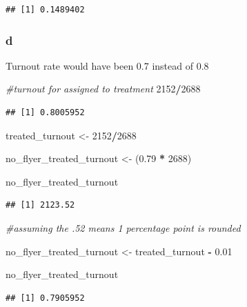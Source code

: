 \documentclass[
]{article}
\newenvironment{Shaded}{\begin{snugshade}}{\end{snugshade}}
\newcommand{\CommentTok}[1]{\textcolor[rgb]{0.56,0.35,0.01}{\textit{#1}}}
\newcommand{\DecValTok}[1]{\textcolor[rgb]{0.00,0.00,0.81}{#1}}
\newcommand{\FloatTok}[1]{\textcolor[rgb]{0.00,0.00,0.81}{#1}}
\newcommand{\NormalTok}[1]{#1}
\newcommand{\OtherTok}[1]{\textcolor[rgb]{0.56,0.35,0.01}{#1}}
\newcommand{\SpecialCharTok}[1]{\textcolor[rgb]{0.81,0.36,0.00}{\textbf{#1}}}
\begin{document}
\begin{verbatim}
## [1] 0.1489402
\end{verbatim}

\subsubsection{d}\label{d-2}

Turnout rate would have been 0.7 instead of 0.8

\begin{Shaded}
\begin{Highlighting}[]
\CommentTok{\#turnout for assigned to treatment}
\DecValTok{2152}\SpecialCharTok{/}\DecValTok{2688}
\end{Highlighting}
\end{Shaded}

\begin{verbatim}
## [1] 0.8005952
\end{verbatim}

\begin{Shaded}
\begin{Highlighting}[]
\NormalTok{treated\_turnout }\OtherTok{\textless{}{-}} \DecValTok{2152}\SpecialCharTok{/}\DecValTok{2688}

\NormalTok{no\_flyer\_treated\_turnout }\OtherTok{\textless{}{-}}\NormalTok{ (}\FloatTok{0.79} \SpecialCharTok{*} \DecValTok{2688}\NormalTok{)}

\NormalTok{no\_flyer\_treated\_turnout }
\end{Highlighting}
\end{Shaded}

\begin{verbatim}
## [1] 2123.52
\end{verbatim}

\begin{Shaded}
\begin{Highlighting}[]
\CommentTok{\#assuming the .52 means 1 percentage point is rounded}

\NormalTok{no\_flyer\_treated\_turnout }\OtherTok{\textless{}{-}}\NormalTok{ treated\_turnout }\SpecialCharTok{{-}} \FloatTok{0.01}

\NormalTok{no\_flyer\_treated\_turnout}
\end{Highlighting}
\end{Shaded}

\begin{verbatim}
## [1] 0.7905952
\end{verbatim}
\end{document}
